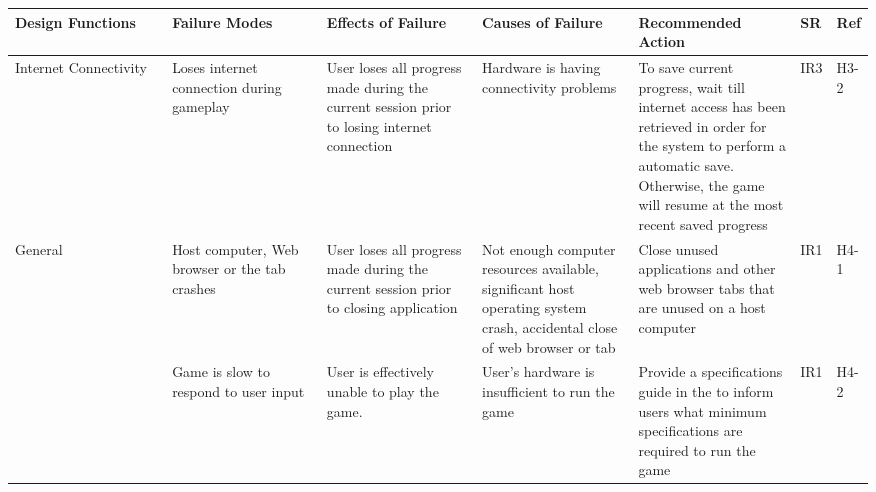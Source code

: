 \documentclass{article}
\begin{document}
\newpage 
\begin{table}[H]
    \begin{adjustbox}{width=\textwidth}
    \centering

    \begin{tabular}{|p{0.20\linewidth} | p{0.20\linewidth} | p{0.20\linewidth}|  p{0.20\linewidth}|  p{0.20\linewidth}|  p{0.05\linewidth}|  p{0.07\linewidth}| }
    \hline
         \textbf{Design Functions} & \textbf{Failure Modes} & \textbf{Effects of Failure} & \textbf{Causes of Failure} & \textbf{Recommended Action} & \textbf{SR} & \textbf{Ref} \\
         
        \hline
        
         Internet Connectivity 
         
         
          & Loses internet connection during gameplay  & User loses all progress made during the current session prior to losing internet connection & Hardware is having connectivity problems & To save current progress, wait till internet access has been retrieved in order for the system to perform a automatic save. Otherwise, the game will resume at the most recent saved progress  & IR3 & H3-2\\
         \hline
        General & Host computer, Web browser or the tab crashes & User loses all progress made during the current session prior to closing application & Not enough computer resources available, significant host operating system crash, accidental close of web browser or tab \newline & Close unused applications and other web browser tabs that are unused on a host computer
        & IR1 & H4-1\\
        
        & Game is slow to respond to user input & User is effectively unable to play the game. & User's hardware is insufficient to run the game & Provide a specifications guide in the to inform users what minimum specifications are required to run the game & IR1 & H4-2\\
        
         \hline
    \end{tabular}
    \end{adjustbox}
    \label{tab:my_label}
\end{table}
\end{document}

